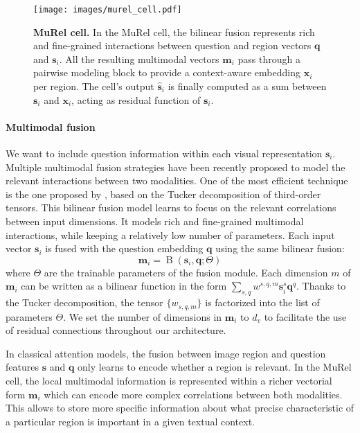 \documentclass[10pt,twocolumn,letterpaper]{article}
\DeclareMathOperator*{\fusion}{B}
\begin{document}
\begin{figure}
    \centering
    \texttt{[image: images/murel\_cell.pdf]}
    \caption{\label{fig:murel_cell} \textbf{MuRel cell.}
    In the MuRel cell, the bilinear fusion represents rich and fine-grained interactions between question and region vectors $\bm{q}$ and $\bm{s}_i$. All the resulting multimodal vectors $\bm{m}_i$ pass through a pairwise modeling block to provide a context-aware embedding $\bm{x}_i$ per region. 
    The cell's output $\hat{\bm{s}}_i$ is finally computed as a sum between ${\bm{s}_i}$ and $\bm{x}_i$, acting as residual function of ${\bm{s}_i}$.}
\end{figure}

\paragraph{Multimodal fusion}
We want to include question information within each visual representation $\bm{s}_i$. 
Multiple multimodal fusion strategies have been recently proposed \cite{Kim2017, FukuiPYRDR16, benyounescadene2017mutan, yu2017mfb, yu2018beyond} to model the relevant interactions between two modalities. One of the most efficient technique is the one proposed by \cite{benyounescadene2017mutan}, based on the Tucker decomposition of third-order tensors. 
This bilinear fusion model learns to focus on the relevant correlations between input dimensions. It models rich and fine-grained multimodal interactions, while keeping a relatively low number of parameters. 
Each input vector $\bm{s}_i$ is fused with the question embedding $\bm{q}$ using the same bilinear fusion:
\begin{equation}
    \bm{m}_i = \fusion \left( \bm{s}_i, \bm{q}; \Theta\right)
\end{equation}
where $\Theta$ are the trainable parameters of the fusion module. Each dimension $m$ of $\bm{m}_i$ can be written as a bilinear function in the form $\sum_{s,q} w^{s,q,m}\bm{s}_i^s \bm{q}^q$. Thanks to the Tucker decomposition, the tensor $\{w_{s,q,m}\}$ is factorized into the list of parameters $\Theta$. We set the number of dimensions in $\bm{m}_i$ to $d_v$ to facilitate the use of residual connections throughout our architecture.

In classical attention models, the fusion between image region and question features $\bm{s}$ and $\bm{q}$ only learns to encode whether a region is relevant. 
In the MuRel cell, the local multimodal information is represented within a richer vectorial form $\bm{m}_i$ which can encode more complex correlations between both modalities. This allows to store more specific information about what precise characteristic of a particular region is important in a given textual context.
\end{document}
